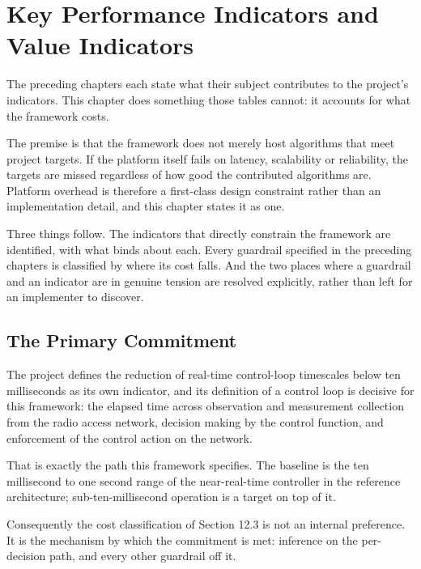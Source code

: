 
\hypertarget{key-performance-indicators-and-value-indicators}{%
\section{Key Performance Indicators and Value Indicators}\label{key-performance-indicators-and-value-indicators}}

The preceding chapters each state what their subject contributes to the
project's indicators. This chapter does something those tables cannot:
it accounts for what the framework costs.

The premise is that the framework does not merely host algorithms that
meet project targets. If the platform itself fails on latency,
scalability or reliability, the targets are missed regardless of how
good the contributed algorithms are. Platform overhead is therefore a
first-class design constraint rather than an implementation detail, and
this chapter states it as one.

Three things follow. The indicators that directly constrain the
framework are identified, with what binds about each. Every guardrail
specified in the preceding chapters is classified by where its cost
falls. And the two places where a guardrail and an indicator are in
genuine tension are resolved explicitly, rather than left for an
implementer to discover.

\hypertarget{the-primary-commitment}{%
\subsection{The Primary Commitment}\label{the-primary-commitment}}

The project defines the reduction of real-time control-loop timescales
below ten milliseconds as its own indicator, and its definition of a
control loop is decisive for this framework: the elapsed time across
observation and measurement collection from the radio access network,
decision making by the control function, and enforcement of the control
action on the network.

That is exactly the path this framework specifies. The baseline is the
ten millisecond to one second range of the near-real-time controller in
the reference architecture; sub-ten-millisecond operation is a target on
top of it.

Consequently the cost classification of Section 12.3 is not an internal
preference. It is the mechanism by which the commitment is met:
inference on the per-decision path, and every other guardrail off it.

